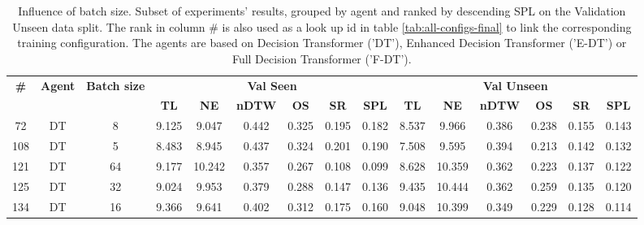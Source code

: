 \begin{table}
\centering
\caption{\label{tab:batch_test}Influence of batch size. Subset of experiments' results, grouped by agent and ranked by descending SPL on the Validation Unseen data split. The rank in column \# is also used as a look up id in table \ref{tab:all-configs-final} to link the corresponding training configuration.     \newline The agents are based on Decision Transformer ('DT'), Enhanced Decision Transformer ('E-DT') or Full Decision Transformer ('F-DT').}
\begin{tabular}{@{\hskip3pt}c@{\hskip3pt}c@{\hskip3pt}c@{\hskip3pt}c@{\hskip3pt}c@{\hskip3pt}c@{\hskip3pt}c@{\hskip3pt}c@{\hskip3pt}c@{\hskip3pt}c@{\hskip3pt}c@{\hskip3pt}c@{\hskip3pt}c@{\hskip3pt}c@{\hskip3pt}c}
\toprule
\textbf{\#} & \textbf{Agent} & \textbf{Batch size} & \multicolumn{6}{c}{\textbf{Val Seen}} & \multicolumn{6}{c}{\textbf{Val Unseen}} \\
 \textbf{~} &     \textbf{~} &          \textbf{~} &       \textbf{TL} & \textbf{NE} & \textbf{nDTW} & \textbf{OS} & \textbf{SR} & \textbf{SPL} &         \textbf{TL} & \textbf{NE} & \textbf{nDTW} & \textbf{OS} & \textbf{SR} & \textbf{SPL} \\
\midrule
         72 &             DT &                   8 &             9.125 &       9.047 &         0.442 &       0.325 &       0.195 &        0.182 &               8.537 &       9.966 &         0.386 &       0.238 &       0.155 &        0.143 \\
        108 &             DT &                   5 &             8.483 &       8.945 &         0.437 &       0.324 &       0.201 &        0.190 &               7.508 &       9.595 &         0.394 &       0.213 &       0.142 &        0.132 \\
        121 &             DT &                  64 &             9.177 &      10.242 &         0.357 &       0.267 &       0.108 &        0.099 &               8.628 &      10.359 &         0.362 &       0.223 &       0.137 &        0.122 \\
        125 &             DT &                  32 &             9.024 &       9.953 &         0.379 &       0.288 &       0.147 &        0.136 &               9.435 &      10.444 &         0.362 &       0.259 &       0.135 &        0.120 \\
        134 &             DT &                  16 &             9.366 &       9.641 &         0.402 &       0.312 &       0.175 &        0.160 &               9.048 &      10.399 &         0.349 &       0.229 &       0.128 &        0.114 \\

\end{tabular}
\end{table}
